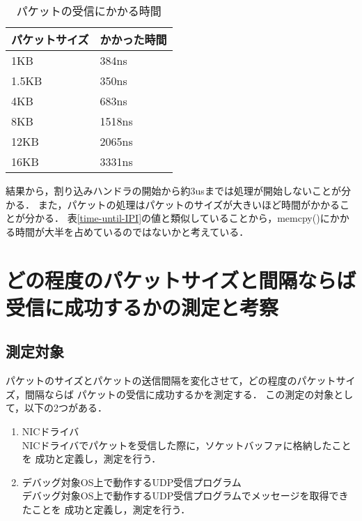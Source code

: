 \documentclass[12pt]{jsarticle}
\begin{document}
\begin{table}[h]
    \caption{パケットの受信にかかる時間}
    \label{time-rx}
    \begin{center}
        \begin{tabular}{l|l}   \hline \hline 
            パケットサイズ & かかった時間 \\ \hline
            1KB            & 384ns        \\ 
            1.5KB          & 350ns        \\ 
            4KB            & 683ns        \\ 
            8KB            & 1518ns       \\ 
            12KB           & 2065ns       \\ 
            16KB           & 3331ns       \\ \hline
        \end{tabular}
    \end{center}
\end{table}

結果から，割り込みハンドラの開始から約3usまでは処理が開始しないことが分かる．
また，パケットの処理はパケットのサイズが大きいほど時間がかかることが分かる．
表\ref{time-until-IPI}の値と類似していることから，memcpy()にかかる時間が大半を占めているのではないかと考えている．

\section{どの程度のパケットサイズと間隔ならば受信に成功するかの測定と考察}

\subsection{測定対象}

パケットのサイズとパケットの送信間隔を変化させて，どの程度のパケットサイズ，間隔ならば
パケットの受信に成功するかを測定する．
この測定の対象として，以下の2つがある．
\begin{enumerate}
    \item NICドライバ\\
        NICドライバでパケットを受信した際に，ソケットバッファに格納したことを
        成功と定義し，測定を行う．
    \item デバッグ対象OS上で動作するUDP受信プログラム\\
        デバッグ対象OS上で動作するUDP受信プログラムでメッセージを取得できたことを
        成功と定義し，測定を行う．
\end{enumerate}
\end{document}
